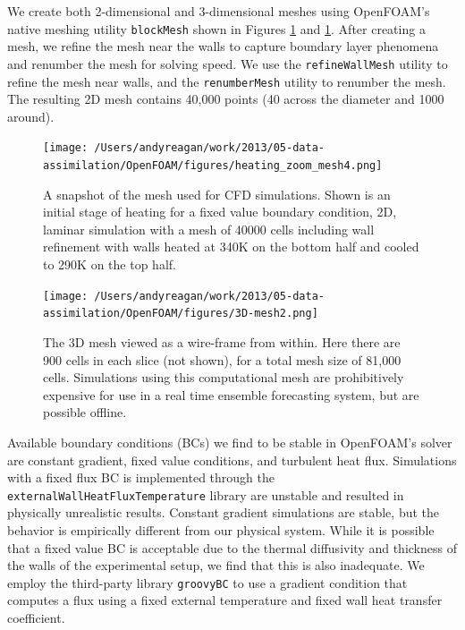We create both 2-dimensional and 3-dimensional meshes using OpenFOAM's native meshing utility \verb|blockMesh| shown in Figures \ref{fig:CFDmesh1} and \ref{fig:CFDmesh1}.
After creating a mesh, we refine the mesh near the walls to capture boundary layer phenomena and renumber the mesh for solving speed.
We use the \verb|refineWallMesh| utility to refine the mesh near walls, and the \verb|renumberMesh| utility to renumber the mesh.
The resulting 2D mesh contains 40,000 points (40 across the diameter and 1000 around).

\begin{figure}[t]
  \centering
  \texttt{[image: /Users/andyreagan/work/2013/05-data-assimilation/OpenFOAM/figures/heating\_zoom\_mesh4.png]}
  \caption[A snapshot of the mesh used for CFD simulations]{
  A snapshot of the mesh used for CFD simulations.
  Shown is an initial stage of heating for a fixed value boundary condition, 2D, laminar simulation with a mesh of 40000 cells including wall refinement with walls heated at 340K on the bottom half and cooled to 290K on the top half.
  }
  \label{fig:CFDmesh1}
\end{figure}

\begin{figure}[t]
  \centering
  \texttt{[image: /Users/andyreagan/work/2013/05-data-assimilation/OpenFOAM/figures/3D-mesh2.png]}
  \caption[The 3D mesh viewed as a wire-frame from within]{
  The 3D mesh viewed as a wire-frame from within.
  Here there are 900 cells in each slice (not shown), for a total mesh size of 81,000 cells.
  Simulations using this computational mesh are prohibitively expensive for use in a real time ensemble forecasting system, but are possible offline.
  }
  \label{fig:CFDmesh2}
\end{figure}

Available boundary conditions (BCs) we find to be stable in OpenFOAM's solver are constant gradient, fixed value conditions, and turbulent heat flux.
Simulations with a fixed flux BC is implemented through the \verb|externalWallHeatFluxTemperature| library are unstable and resulted in physically unrealistic results.
Constant gradient simulations are stable, but the behavior is empirically different from our physical system.
While it is possible that a fixed value BC is acceptable due to the thermal diffusivity and thickness of the walls of the experimental setup, we find that this is also inadequate.
We employ the third-party library \verb|groovyBC| to use a gradient condition that computes a flux using a fixed external temperature and fixed wall heat transfer coefficient.

